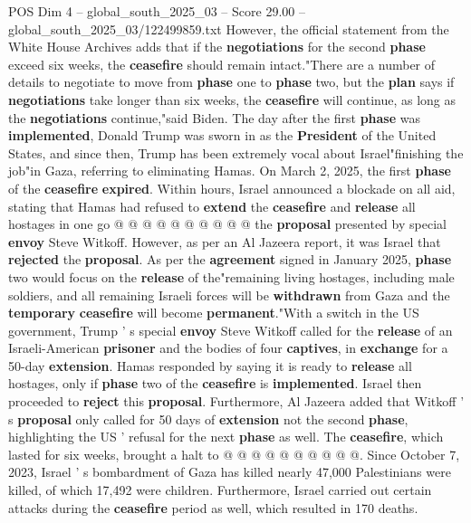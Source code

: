 \begin{textsample}{POS Dim 4 – global\_south\_2025\_03 – Score 29.00 – global\_south\_2025\_03/122499859.txt}
However, the official statement from the White House Archives adds that if the \textbf{negotiations} for the second \textbf{phase} exceed six weeks, the \textbf{ceasefire} should remain intact."There are a number of details to negotiate to move from \textbf{phase} one to \textbf{phase} two, but the \textbf{plan} says if \textbf{negotiations} take longer than six weeks, the \textbf{ceasefire} will continue, as long as the \textbf{negotiations} continue,"said Biden.
The day after the first \textbf{phase} was \textbf{implemented}, Donald Trump was sworn in as the \textbf{President} of the United States, and since then, Trump has been extremely vocal about Israel"finishing the job"in Gaza, referring to eliminating Hamas.
On March 2, 2025, the first \textbf{phase} of the \textbf{ceasefire} \textbf{expired}.
Within hours, Israel announced a blockade on all aid, stating that Hamas had refused to \textbf{extend} the \textbf{ceasefire} and \textbf{release} all hostages in one go @ @ @ @ @ @ @ @ @ @ the \textbf{proposal} presented by special \textbf{envoy} Steve Witkoff.
However, as per an Al Jazeera report, it was Israel that \textbf{rejected} the \textbf{proposal}.
As per the \textbf{agreement} signed in January 2025, \textbf{phase} two would focus on the \textbf{release} of the"remaining living hostages, including male soldiers, and all remaining Israeli forces will be \textbf{withdrawn} from Gaza and the \textbf{temporary} \textbf{ceasefire} will become \textbf{permanent}."With a switch in the US government, Trump ' s special \textbf{envoy} Steve Witkoff called for the \textbf{release} of an Israeli-American \textbf{prisoner} and the bodies of four \textbf{captives}, in \textbf{exchange} for a 50-day \textbf{extension}.
Hamas responded by saying it is ready to \textbf{release} all hostages, only if \textbf{phase} two of the \textbf{ceasefire} is \textbf{implemented}.
Israel then proceeded to \textbf{reject} this \textbf{proposal}.
Furthermore, Al Jazeera added that Witkoff ' s \textbf{proposal} only called for 50 days of \textbf{extension} not the second \textbf{phase}, highlighting the US ' refusal for the next \textbf{phase} as well.
The \textbf{ceasefire}, which lasted for six weeks, brought a halt to @ @ @ @ @ @ @ @ @ @.
Since October 7, 2023, Israel ' s bombardment of Gaza has killed nearly 47,000 Palestinians were killed, of which 17,492 were children.
Furthermore, Israel carried out certain attacks during the \textbf{ceasefire} period as well, which resulted in 170 deaths.

\end{textsample}
